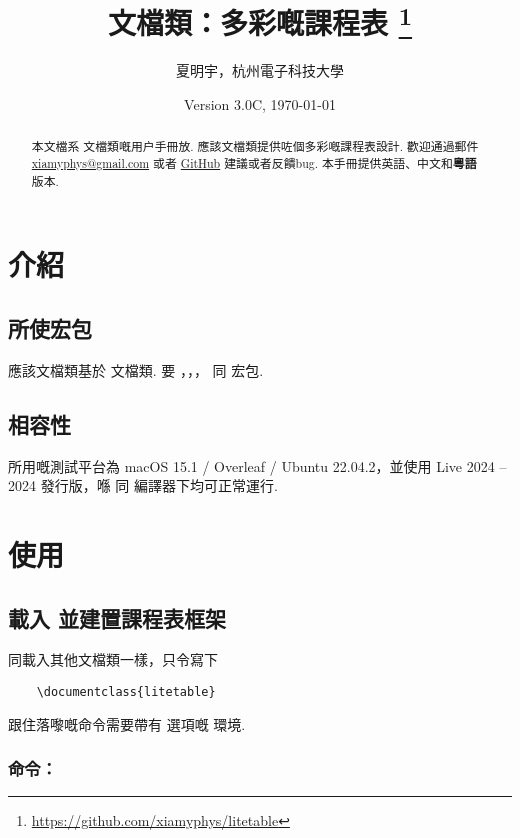 \documentclass[letterpaper]{l3doc}
\title{
    \cls{litetable} 文檔類：多彩嘅課程表
    \thanks{\url{https://github.com/xiamyphys/litetable}}
}
\author{夏明宇，杭州電子科技大學}
\affil{\href{mailto:xiamyphys@gmail.com}{xiamyphys@gmail.com}}
\date{Version 3.0C, \today}
\begin{document}
\maketitle

\begin{abstract}
    本文檔系  文檔類嘅用户手冊放. 應該文檔類提供咗個多彩嘅課程表設計. 歡迎通過郵件 \href{mailto:xiamyphys@gmail.com}{xiamyphys@gmail.com} 或者 \href{https://github.com/xiamyphys/litetable/issues}{GitHub} 建議或者反饋bug. 本手冊提供英語、中文和\textbf{粵語}版本.
\end{abstract}

\section{介紹}

\subsection{所使宏包}

應該文檔類基於  文檔類. 要 ，，， 同  宏包. 

\subsection{相容性}

所用嘅測試平台為 macOS 15.1 / Overleaf / Ubuntu 22.04.2，並使用 Live 2024 -- 2024 發行版，喺  同  編譯器下均可正常運行.

\section{使用}

\subsection{載入  並建置課程表框架}

同載入其他文檔類一樣，只令寫下

\begin{Verbatim}
    \documentclass{litetable}
\end{Verbatim}

跟住落嚟嘅命令需要帶有  選項嘅  環境.

\subsubsection{命令：}
\end{document}
